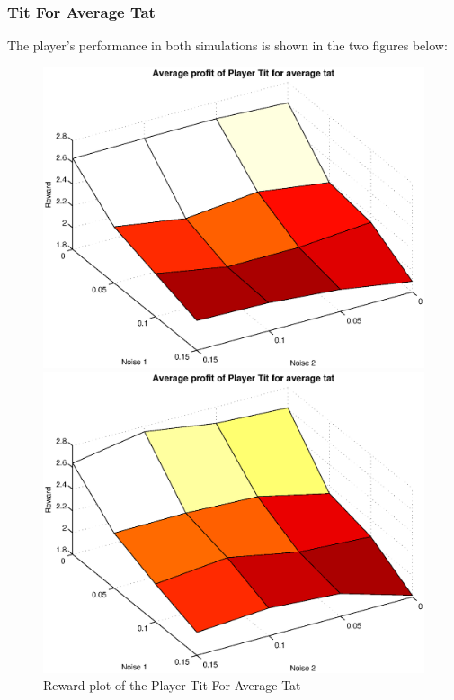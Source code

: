 \subsubsection{Tit For Average Tat}
The player's performance in both simulations is shown in the two figures below:
\begin{figure}[h]

\begin{minipage}[hbt]{0.65\textwidth}
	\centering
	\includegraphics[width=\textwidth]{pics/simulation1/Reward_vs_Noise_of_Player_Tit_for_average_tat}
\end{minipage}
\hfill
\begin{minipage}[hbt]{0.3\textwidth}
	\centering
	\includegraphics[width=\textwidth]{pics/simulation2/Reward_vs_Noise_of_Player_Tit_for_average_tat}
\end{minipage}
	\caption{Reward plot of the Player Tit For Average Tat}
	\label{pic player tfat}
\end{figure}

